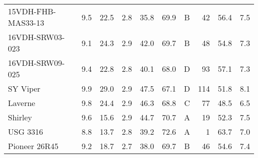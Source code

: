 \documentclass[12pt, letterpaper]{article}
\begin{document}
\begin{landscape}
\begin{table}[ht]
\begin{tabular}{lrrrrrcrrr}
  15VDH-FHB-MAS33-13 & 9.5 & 22.5 & 2.8 & 35.8 & 69.9 & B & 42  & 56.4 & 7.5 \\ 
  16VDH-SRW03-023    & 9.1 & 24.3 & 2.9 & 42.0 & 69.7 & B & 48  & 54.8 & 7.3 \\ 
  16VDH-SRW09-025    & 9.4 & 22.8 & 2.8 & 40.1 & 68.0 & D & 93  & 57.1 & 7.3 \\ 
  SY Viper           & 9.9 & 29.0 & 2.9 & 47.5 & 67.1 & D & 114 & 51.8 & 8.1 \\ 
  Laverne            & 9.8 & 24.4 & 2.9 & 46.3 & 68.8 & C & 77  & 48.5 & 6.5 \\ 
  Shirley            & 9.6 & 15.6 & 2.9 & 44.7 & 70.7 & A & 19  & 52.3 & 7.5 \\ 
  USG 3316           & 8.8 & 13.7 & 2.8 & 39.2 & 72.6 & A & 1   & 63.7 & 7.0 \\ 
  Pioneer 26R45      & 9.2 & 18.7 & 2.7 & 38.0 & 69.7 & B & 46  & 54.6 & 7.4 \\ 
   \hline
\end{tabular}

\bigskip


\end{table}
\end{landscape}
\end{document}
